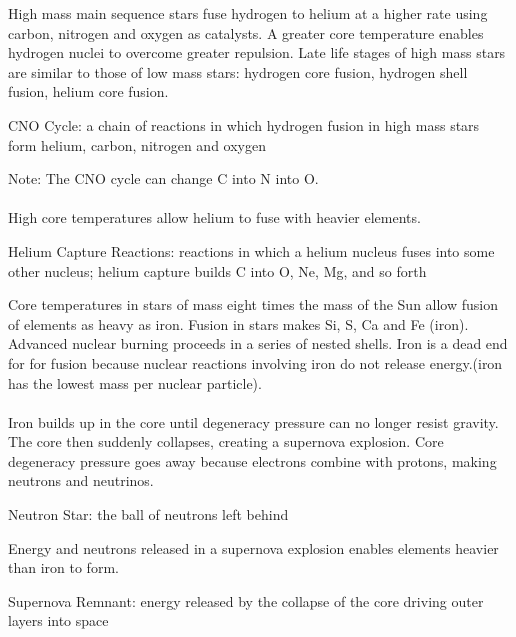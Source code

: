 \documentclass[12pt]{article}
\begin{document}
High mass main sequence stars fuse hydrogen to helium at a higher rate using carbon, nitrogen and oxygen as catalysts. A greater core temperature enables hydrogen nuclei to overcome greater repulsion. Late life stages of high mass stars are similar to those of low mass stars: hydrogen core fusion, hydrogen shell fusion, helium core fusion. 
\begin{definition} CNO Cycle: a chain of reactions in which hydrogen fusion in high mass stars form helium, carbon, nitrogen and oxygen \end{definition}
Note: The CNO cycle can change C into N into O. \\~\\
High core temperatures allow helium to fuse with heavier elements. 
\begin{definition} Helium Capture Reactions: reactions in which a helium nucleus fuses into some other nucleus; helium capture builds C into O, Ne, Mg, and so forth \end{definition}
Core temperatures in stars of mass eight times the mass of the Sun allow fusion of elements as heavy as iron. Fusion in stars makes Si, S, Ca and Fe (iron). Advanced nuclear burning proceeds in a series of nested shells. Iron is a dead end for for fusion because nuclear reactions involving iron do not release energy.(iron has the lowest mass per nuclear particle). \\~\\
Iron builds up in the core until degeneracy pressure can no longer resist gravity. The core then suddenly collapses, creating a supernova explosion. Core degeneracy pressure goes away because electrons combine with protons, making neutrons and neutrinos. 
\begin{definition} Neutron Star: the ball of neutrons left behind \end{definition}
Energy and neutrons released in a supernova explosion enables elements heavier than iron to form. 
\begin{definition} Supernova Remnant: energy released by the collapse of the core driving outer layers into space \end{definition}
\end{document}
